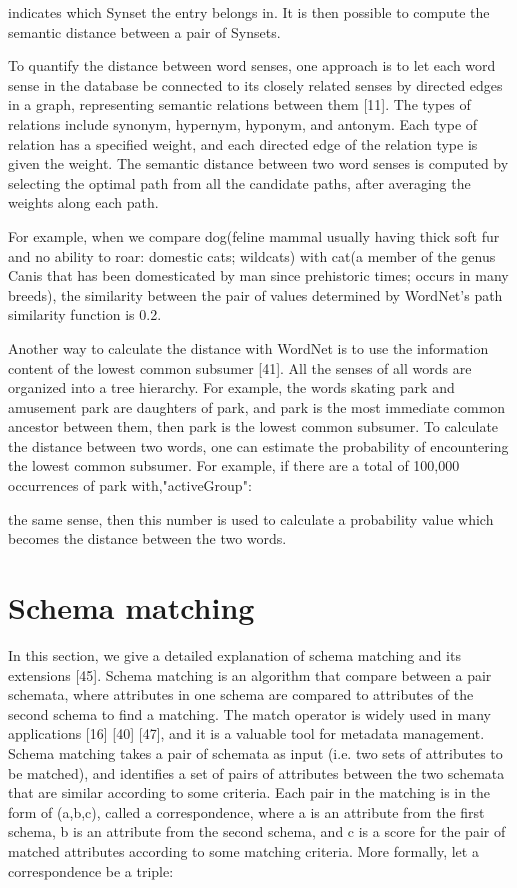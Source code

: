 indicates which Synset the entry belongs in. It is then possible to compute the semantic distance between a pair of Synsets.

To quantify the distance between word senses, one approach is to let each word sense in the database be connected to its closely related senses by directed edges in a graph, representing semantic relations between them [11]. The types of relations include synonym, hypernym, hyponym, and antonym. Each type of relation has a specified weight, and each directed edge of the relation type is given the weight. The semantic distance between two word senses is computed by selecting the optimal path from all the candidate paths, after averaging the weights along each path.

For example, when we compare dog(feline mammal usually having thick soft fur and no ability to roar: domestic cats; wildcats) with cat(a member of the genus Canis that has been domesticated by man since prehistoric times; occurs in many breeds), the similarity between the pair of values determined by WordNet's path similarity function is 0.2.

Another way to calculate the distance with WordNet is to use the information content of the lowest common subsumer [41]. All the senses of all words are organized into a tree hierarchy. For example, the words skating park and amusement park are daughters of park, and park is the most immediate common ancestor between them, then park is the lowest common subsumer. To calculate the distance between two words, one can estimate the probability of encountering the lowest common subsumer. For example, if there are a total of 100,000 occurrences of park with,"activeGroup":

the same sense, then this number is used to calculate a probability value which becomes the distance between the two words.

\section{Schema matching}
\label{sec:SchemaMatching}

In this section, we give a detailed explanation of schema matching and its extensions [45]. Schema matching is an algorithm that compare between a pair schemata, where attributes in one schema are compared to attributes of the second schema to find a matching. The match operator is widely used in many applications [16] [40] [47], and it is a valuable tool for metadata management. Schema matching takes a pair of schemata as input (i.e. two sets of attributes to be matched), and identifies a set of pairs of attributes between the two schemata that are similar according to some criteria. Each pair in the matching is in the form of (a,b,c), called a correspondence, where a is an attribute from the first schema, b is an attribute from the second schema, and c is a score for the pair of matched attributes according to some matching criteria.
More formally, let a correspondence be a triple:

